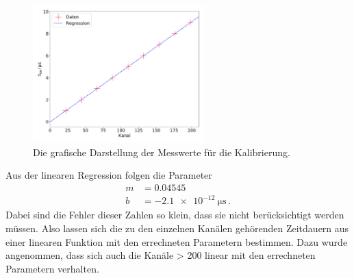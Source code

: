 \documentclass[
  bibliography=totoc,     %
  captions=tableheading,  %
  titlepage=firstiscover, %
]{scrartcl}
\begin{document}
\begin{figure}
  \centering
  \includegraphics[width=0.59\textwidth]{kal20.pdf}
  \caption{Die grafische Darstellung der Messwerte für die Kalibrierung.}
  \label{fig:3}
\end{figure}
\noindent
Aus der linearen Regression folgen die Parameter
\begin{align}
  m &= \num{0.04545} \\
  b &= \SI{-2.1e-12}{\micro\second} \, .
\end{align}
Dabei sind die Fehler dieser Zahlen so klein, dass sie
nicht berücksichtigt werden müssen. Also lassen sich die zu den einzelnen
Kanälen gehörenden Zeitdauern aus einer linearen Funktion mit den errechneten
Parametern bestimmen. Dazu wurde angenommen, dass sich auch die Kanäle > 200
linear mit den errechneten Parametern verhalten.
\end{document}

